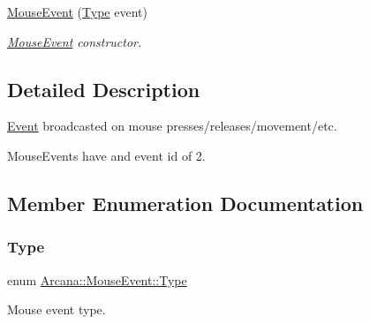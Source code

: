 \begin{DoxyCompactItemize}
\mbox{\label{class_arcana_1_1_mouse_event_a638a251a9da475e8ac418a1239b8c99d}} 
\mbox{\hyperlink{class_arcana_1_1_mouse_event_a638a251a9da475e8ac418a1239b8c99d}{Mouse\+Event}} (\mbox{\hyperlink{class_arcana_1_1_mouse_event_aef6393d6d26e822bd527617c64acadea}{Type}} event)
\begin{DoxyCompactList}\small\item\em \mbox{\hyperlink{class_arcana_1_1_mouse_event}{Mouse\+Event}} constructor. \end{DoxyCompactList}\end{DoxyCompactItemize}


\subsection{Detailed Description}
\mbox{\hyperlink{class_arcana_1_1_event}{Event}} broadcasted on mouse presses/releases/movement/etc. 

Mouse\+Events have and event id of 2. 

\subsection{Member Enumeration Documentation}
\mbox{\label{class_arcana_1_1_mouse_event_aef6393d6d26e822bd527617c64acadea}} 
\subsubsection{\texorpdfstring{Type}{Type}}
{\footnotesize\ttfamily enum \mbox{\hyperlink{class_arcana_1_1_mouse_event_aef6393d6d26e822bd527617c64acadea}{Arcana\+::\+Mouse\+Event\+::\+Type}}}



Mouse event type. 

